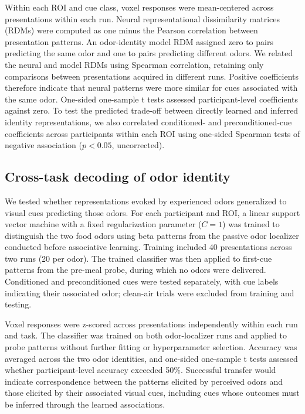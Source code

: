 \documentclass[12pt,letterpaper]{article}
\begin{document}
Within each ROI and cue class, voxel responses were mean-centered across presentations within each run. Neural representational dissimilarity matrices (RDMs) were computed as one minus the Pearson correlation between presentation patterns. An odor-identity model RDM assigned zero to pairs predicting the same odor and one to pairs predicting different odors. We related the neural and model RDMs using Spearman correlation, retaining only comparisons between presentations acquired in different runs. Positive coefficients therefore indicate that neural patterns were more similar for cues associated with the same odor. One-sided one-sample t tests assessed participant-level coefficients against zero. To test the predicted trade-off between directly learned and inferred identity representations, we also correlated conditioned- and preconditioned-cue coefficients across participants within each ROI using one-sided Spearman tests of negative association ($p < 0.05$, uncorrected).

\subsection*{Cross-task decoding of odor identity}

We tested whether representations evoked by experienced odors generalized to visual cues predicting those odors. For each participant and ROI, a linear support vector machine with a fixed regularization parameter ($C = 1$) was trained to distinguish the two food odors using beta patterns from the passive odor localizer conducted before associative learning. Training included 40 presentations across two runs (20 per odor). The trained classifier was then applied to first-cue patterns from the pre-meal probe, during which no odors were delivered. Conditioned and preconditioned cues were tested separately, with cue labels indicating their associated odor; clean-air trials were excluded from training and testing.

Voxel responses were z-scored across presentations independently within each run and task. The classifier was trained on both odor-localizer runs and applied to probe patterns without further fitting or hyperparameter selection. Accuracy was averaged across the two odor identities, and one-sided one-sample t tests assessed whether participant-level accuracy exceeded 50\%. Successful transfer would indicate correspondence between the patterns elicited by perceived odors and those elicited by their associated visual cues, including cues whose outcomes must be inferred through the learned associations.
\end{document}
